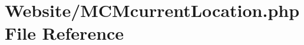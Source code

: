 \hypertarget{_m_c_mcurrent_location_8php}{\section{Website/\-M\-C\-Mcurrent\-Location.php File Reference}
\label{_m_c_mcurrent_location_8php}
}
